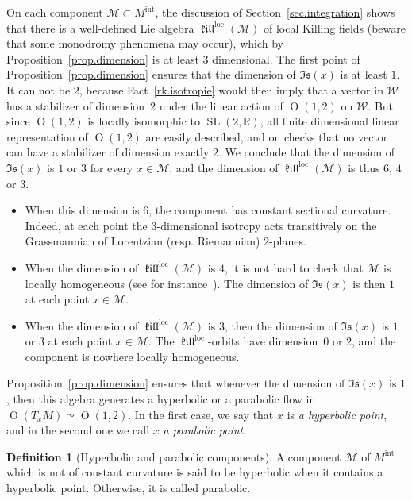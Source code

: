 \documentclass[11pt]{article}
\theoremstyle{definition}
\newtheorem{defi}[theo]{Definition}
\numberwithin{equation}{section}
\numberwithin{figure}{section}
\numberwithin{table}{section}
\DeclareMathOperator{\SL}{SL}
\DeclareMathOperator{\loc}{loc}
\newcommand{\mint}{{M^{\intl}}}
\DeclareMathOperator{\intl}{int}
\DeclareMathOperator{\kil}{{\mathfrak{kill}}}
\newcommand{\kiloc}{\kil^{\loc}}
\newcommand{\calm}{\mathcal{M}}
\newcommand*\RR{\mathbb{R}}
\begin{document}
On each component ${\mathcal M} \subset \mint$, the discussion of Section~\ref{sec.integration} shows that there is a well-defined Lie algebra $\kiloc({\mathcal M})$ of local Killing fields (beware that some monodromy phenomena may occur), which by Proposition~\ref{prop.dimension} is at least $3$ dimensional. The first point of Proposition~\ref{prop.dimension} ensures that the dimension of $\mathfrak{Is}(x)$ is at least $1$. It can not be $2$, because Fact~\ref{rk.isotropie} would then imply that a vector in $\mathcal{W}$ has a stabilizer of dimension~$2$ under the linear action of ${\operatorname O}(1,2)$ on $\mathcal{W}$. But since ${\operatorname O}(1,2)$ is locally isomorphic to $\SL(2,\RR)$, all finite dimensional linear representation of ${\operatorname O}(1,2)$ are easily described, and on checks that no vector can have a stabilizer of dimension exactly $2$. We conclude that the dimension of $\mathfrak{Is}(x)$ is $1$ or $3$ for every $x \in {\mathcal M}$, and the dimension of $\kiloc({\mathcal M})$ is thus $6$, $4$ or $3$.
\begin{itemize}
\item \label{list3.5.a} When this dimension is $6$, the component has constant sectional curvature. Indeed, at each point the $3$-dimensional isotropy acts transitively on the Grassmannian of Lorentzian (resp. Riemannian) $2$-planes.
\item \label{list3.5.b} When the dimension of $\kiloc({\mathcal M})$ is $4$, it is not hard to check that $\calm$ is locally homogeneous (see for instance~\cite[Lemma~4]{sorin.karin}). The dimension of $\mathfrak{Is}(x)$ is then $1$ at each point $x \in \calm$.
\item \label{list3.5.c} When the dimension of $\kiloc({\mathcal M})$ is $3$, then the dimension of $\mathfrak{Is}(x)$ is $1$ or $3$ at each point $x \in \calm$. The $\kiloc$-orbits have dimension~$0$ or $2$, and the component is nowhere locally homogeneous.
\end{itemize}


Proposition~\ref{prop.dimension} ensures that whenever the dimension of $\mathfrak{Is}(x)$ is $1$, then this algebra generates a hyperbolic or a parabolic flow in ${\operatorname O}(T_xM) \simeq {\operatorname O}(1,2)$. In the first case, we say that $x$ is \emph{a hyperbolic point}, and in the second one we call $x$ \emph{a parabolic point}.

\begin{defi}[Hyperbolic and parabolic components]
A component ${\mathcal M}$ of $\mint$ which is not of constant curvature is said to be hyperbolic when it contains a hyperbolic point. Otherwise, it is called parabolic.
\end{defi}
\end{document}
